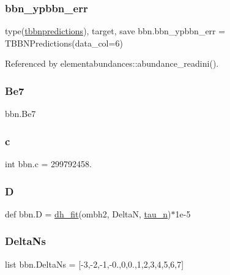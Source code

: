\subsubsection{\texorpdfstring{bbn\+\_\+ypbbn\+\_\+err}{bbn\_ypbbn\_err}}
{\footnotesize\ttfamily type(\mbox{\hyperlink{structbbn_1_1tbbnpredictions}{tbbnpredictions}}), target, save bbn.\+bbn\+\_\+ypbbn\+\_\+err = T\+B\+B\+N\+Predictions(data\+\_\+col=6)}



Referenced by elementabundances\+::abundance\+\_\+readini().

\mbox{\label{namespacebbn_a8f6f39fb3510b10df3c72c5db5546bc6}} 
\subsubsection{\texorpdfstring{Be7}{Be7}}
{\footnotesize\ttfamily bbn.\+Be7}

\mbox{\label{namespacebbn_ac2a771643cfcc5258e2d0a8d61096152}} 
\subsubsection{\texorpdfstring{c}{c}}
{\footnotesize\ttfamily int bbn.\+c = 299792458.}

\mbox{\label{namespacebbn_a09803392cfa25aa97a65a0a040c37c65}} 
\subsubsection{\texorpdfstring{D}{D}}
{\footnotesize\ttfamily def bbn.\+D = \mbox{\hyperlink{namespacebbn_aeb738a501c7541234a13c16aeb6dbdf7}{dh\+\_\+fit}}(ombh2, DeltaN, \mbox{\hyperlink{namespacebbn_a159aaa1465ea9c0555826fa3ea17d3ed}{tau\+\_\+n}})$\ast$1e-\/5}

\mbox{\label{namespacebbn_a321af84b9281c0021371c705561390e1}} 
\subsubsection{\texorpdfstring{Delta\+Ns}{DeltaNs}}
{\footnotesize\ttfamily list bbn.\+Delta\+Ns = \mbox{[}-\/3,-\/2,-\/1,-\/0.,0,0.,1,2,3,4,5,6,7\mbox{]}}

